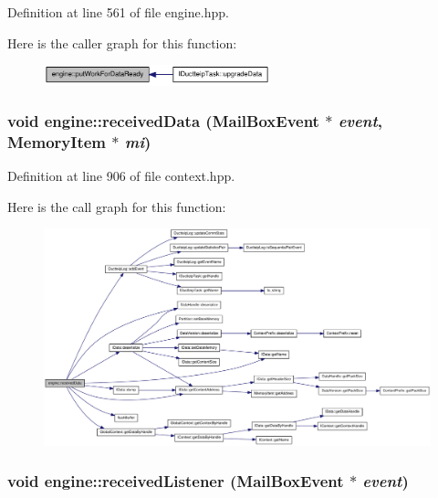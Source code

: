 Definition at line 561 of file engine.hpp.

Here is the caller graph for this function:\nopagebreak
\begin{figure}[H]
\begin{center}
\leavevmode
\includegraphics[width=186pt]{classengine_a18d1d14ee93df029db2216460a8ac6f4_icgraph}
\end{center}
\end{figure}
\hypertarget{classengine_ab244f803ac3edc7ec1341e9b9a11ca33}{
\subsubsection[{receivedData}]{\setlength{\rightskip}{0pt plus 5cm}void engine::receivedData ({\bf MailBoxEvent} $\ast$ {\em event}, \/  {\bf MemoryItem} $\ast$ {\em mi})}}
\label{classengine_ab244f803ac3edc7ec1341e9b9a11ca33}


Definition at line 906 of file context.hpp.

Here is the call graph for this function:\nopagebreak
\begin{figure}[H]
\begin{center}
\leavevmode
\includegraphics[width=420pt]{classengine_ab244f803ac3edc7ec1341e9b9a11ca33_cgraph}
\end{center}
\end{figure}
\hypertarget{classengine_ae0b940ebb7f5104cc2757bc9c92d0708}{
\subsubsection[{receivedListener}]{\setlength{\rightskip}{0pt plus 5cm}void engine::receivedListener ({\bf MailBoxEvent} $\ast$ {\em event})}}
\label{classengine_ae0b940ebb7f5104cc2757bc9c92d0708}


